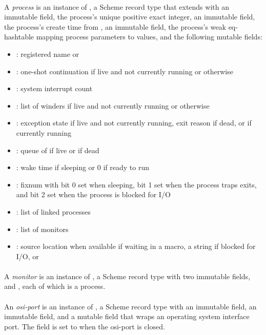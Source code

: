 \paragraph {}
A \emph{process} is an instance of , a Scheme record type
that extends  with an immutable  field, the process's
unique positive exact integer, an immutable  field,
the process's create time from , an immutable
 field, the process's weak eq-hashtable mapping
process parameters to values, and the following mutable fields:
\begin{itemize}
\item {}: registered name or 
\item {}: one-shot continuation if live and not currently
  running or  otherwise
\item {}: system interrupt count
\item {}: list of winders if live and not currently
  running or \code{()} otherwise
\item {}: exception state if live and not
  currently running, exit reason if dead, or  if currently
  running
\item {}: queue of  if live or  if
  dead
\item {}: wake time if sleeping or 0 if ready to run
\item {}: fixnum with bit 0 set when sleeping, bit 1 set
  when the process traps exits, and bit 2 set when the process is
  blocked for I/O
\item {}: list of linked processes
\item {}: list of monitors
\item {}: source location  when available if waiting in a 
  macro, a string if blocked for I/O, or 
\end{itemize}

\paragraph {}
A \emph{monitor} is an instance of , a Scheme record type
with two immutable fields,  and , each
of which is a process.

\paragraph {}
An \emph{osi-port} is an instance of , a Scheme record
type with an immutable  field, an immutable
 field, and a mutable  field that wraps
an operating system interface port. The  field is set to
 when the osi-port is closed.

